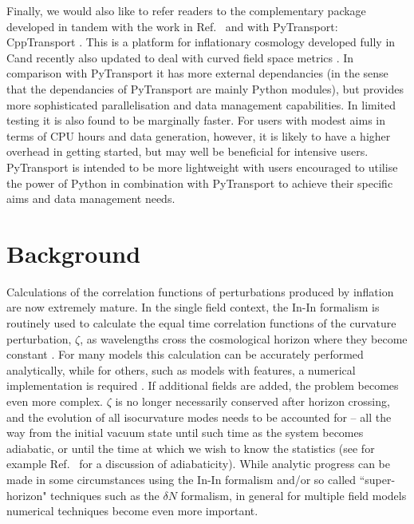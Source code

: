 \documentclass[10pt,
amsmath,amssymb,
aps,prd,nofootinbib,eqsecnum,a4paper]{revtex4}
\newcommand{\CC}{C\nolinebreak\hspace{-.05em}\raisebox{.4ex}{\tiny\bf +}\nolinebreak\hspace{-.10em}\raisebox{.4ex}{\tiny\bf +}}
\def\CC{{C\nolinebreak[4]\hspace{-.05em}\raisebox{.4ex}{\tiny\bf ++}}}
\begin{document}
Finally, we would also like to refer readers to the complementary package developed 
in tandem with the work in Ref.~\cite{Dias:2016rjq} and with PyTransport: CppTransport \cite{Seery:2016lko}. This is a platform for inflationary 
cosmology developed fully in \CC and recently also 
updated to deal with curved field space metrics \cite{seeryNew}. In comparison with PyTransport it  has 
more external dependancies (in the sense that the dependancies of PyTransport are mainly 
Python modules), but provides more sophisticated parallelisation and data management capabilities. 
In limited testing it is also found to be marginally faster.
For users with modest aims in terms of CPU hours and data generation, however, it is likely to have a higher 
overhead 
in getting started, but may well be beneficial for intensive users. PyTransport 
is intended to be more lightweight with users encouraged to utilise the power of Python in combination 
with PyTransport to achieve their specific aims and data management needs.


\section{Background} 

Calculations of the correlation functions of perturbations produced by inflation 
are now extremely mature.
In the single field context, the In-In formalism is routinely used to calculate the equal time correlation 
functions of the 
curvature perturbation, $\zeta$, as wavelengths cross the cosmological horizon 
\cite{Maldacena:2002vr, Seery:2005wm, Chen:2006nt,Elliston:2012ab} where they become 
constant \cite{Rigopoulos:2003ak,Lyth:2004gb}. 
For many models this calculation can be accurately performed 
analytically, while for others, such as models with features, 
a numerical implementation is required \cite{Chen:2006xjb,Chen:2008wn,Hazra:2012yn,Funakoshi:2012ms}. 
If additional fields are added, the problem becomes even more complex. $\zeta$ is no longer 
necessarily conserved after horizon crossing, and the evolution of all 
isocurvature modes needs to be accounted for --    
all the way from the initial vacuum state until such time as the system becomes adiabatic, or until the time at which we wish to know the statistics  (see for example Ref.~\cite{Elliston:2011dr} 
for a discussion of adiabaticity). While analytic progress can be made in some circumstances 
using the In-In formalism and/or so called ``super-horizon" techniques such as the $\delta N$ formalism, 
in general for multiple field models numerical techniques become even more important. 
\end{document}
